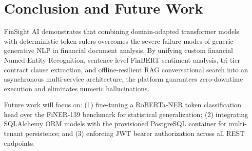 \documentclass[conference]{IEEEtran}
\begin{document}
\section{Conclusion and Future Work}
FinSight AI demonstrates that combining domain-adapted transformer models with deterministic token rulers overcomes the severe failure modes of generic generative NLP in financial document analysis. By unifying custom financial Named Entity Recognition, sentence-level FinBERT sentiment analysis, tri-tier contract clause extraction, and offline-resilient RAG conversational search into an asynchronous multi-service architecture, the platform guarantees zero-downtime execution and eliminates numeric hallucinations. 

Future work will focus on: (1) fine-tuning a RoBERTa-NER token classification head over the FiNER-139 benchmark for statistical generalization; (2) integrating SQLAlchemy ORM models with the provisioned PostgreSQL container for multi-tenant persistence; and (3) enforcing JWT bearer authorization across all REST endpoints.
\end{document}
